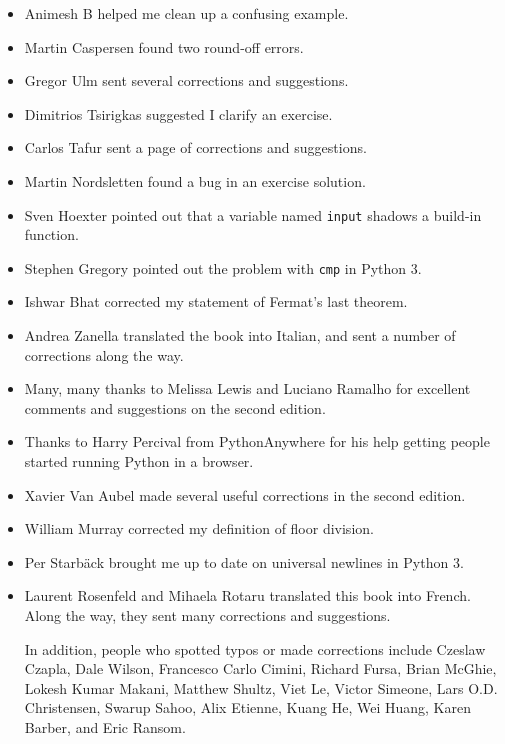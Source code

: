 \documentclass[10pt]{book}
\begin{document}
\begin{itemize}
\item Animesh B helped me clean up a confusing example.

\item Martin Caspersen found two round-off errors.

\item Gregor Ulm sent several corrections and suggestions.

\item Dimitrios Tsirigkas suggested I clarify an exercise.

\item Carlos Tafur sent a page of corrections and suggestions.

\item Martin Nordsletten found a bug in an exercise solution.

\item Sven Hoexter pointed out that a variable named {\tt input}
shadows a build-in function.

\item Stephen Gregory pointed out the problem with {\tt cmp}
in Python 3.

\item Ishwar Bhat corrected my statement of Fermat's last theorem.

\item Andrea Zanella translated the book into Italian, and sent a
number of corrections along the way.

\item Many, many thanks to Melissa Lewis and Luciano Ramalho for
  excellent comments and suggestions on the second edition.

\item Thanks to Harry Percival from PythonAnywhere for his help
getting people started running Python in a browser.

\item Xavier Van Aubel made several useful corrections in the second
edition.

\item William Murray corrected my definition of floor division.

\item Per Starb{\"a}ck brought me up to date on universal newlines in Python 3.

\item Laurent Rosenfeld and Mihaela Rotaru translated this book into French.  Along the way, they sent many corrections and suggestions.


In addition, people who spotted typos or made corrections include
Czeslaw Czapla, Dale Wilson, Francesco Carlo Cimini,
Richard Fursa, Brian McGhie, Lokesh Kumar Makani, Matthew Shultz, Viet
Le, Victor Simeone, Lars O.D. Christensen, Swarup Sahoo, Alix Etienne,
Kuang He, Wei Huang, Karen Barber, and Eric Ransom.




\end{itemize}
\end{document}
